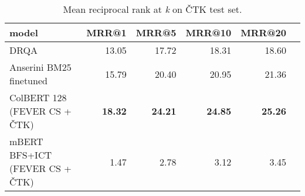 \begin{table}[H] \label{table:ctk-mrr}
    \centering
    \begin{tabular}{lrrrrr}
    \toprule
                              model &  MRR@1 &   MRR@5 &  MRR@10 &  MRR@20  \\
    \midrule
                               DRQA &  13.05 &  17.72 &   18.31 &   18.60  \\
            Anserini BM25 finetuned &  15.79 &   20.40 &   20.95 &   21.36  \\
           ColBERT 128 (FEVER CS + ČTK) &  \textbf{18.32} &   \textbf{24.21} &   \textbf{24.85} &   \textbf{25.26}  \\
     mBERT BFS+ICT (FEVER CS + ČTK) &   1.47 &    2.78 &    3.12 &    3.45  \\
    \bottomrule
    \end{tabular}
    \caption{Mean reciprocal rank at \emph{k} on ČTK test set.}
\end{table}